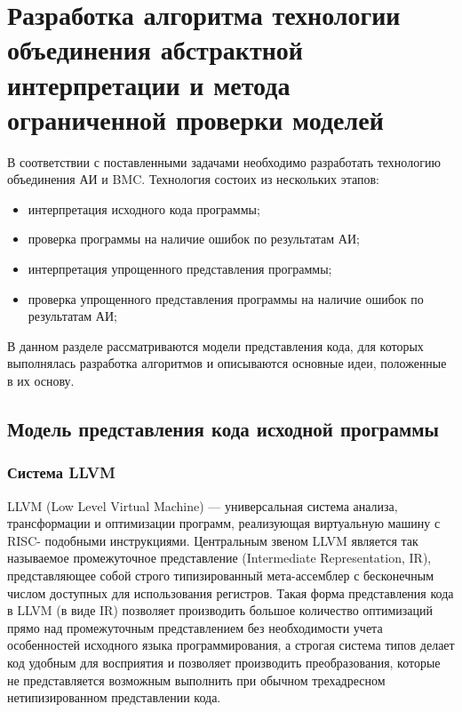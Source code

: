 \chapter{Разработка алгоритма технологии объединения абстрактной интерпретации 
и метода ограниченной проверки моделей}
\label{chapter:algorithm}
В соответствии с поставленными задачами необходимо разработать технологию
объединения АИ и BMC. Технология состоих из нескольких этапов:
\begin{itemize}
\item интерпретация исходного кода программы;
\item проверка программы на наличие ошибок по результатам АИ;
\item интерпретация упрощенного представления программы;
\item проверка упрощенного представления программы на наличие ошибок по 
результатам АИ;
\end{itemize}

В данном разделе рассматриваются модели представления кода, для которых 
выполнялась разработка алгоритмов и описываются основные идеи, положенные в их
основу.

\section{Модель представления кода исходной программы}

\subsection{Система LLVM}
LLVM (Low Level Virtual Machine) --- универсальная система анализа, 
трансформации и оптимизации программ, реализующая виртуальную машину с RISC-
подобными инструкциями. Центральным звеном LLVM является так называемое 
промежуточное представление (Intermediate Representation, IR), представляющее 
собой строго типизированный мета-ассемблер с бесконечным числом доступных для 
использования регистров.  Такая форма представления кода в LLVM (в виде IR) 
позволяет производить большое количество оптимизаций прямо над промежуточным 
представлением без необходимости учета особенностей исходного языка 
программирования, а строгая система типов делает код удобным для восприятия и 
позволяет производить преобразования, которые не представляется возможным 
выполнить при обычном трехадресном нетипизированном представлении кода.

